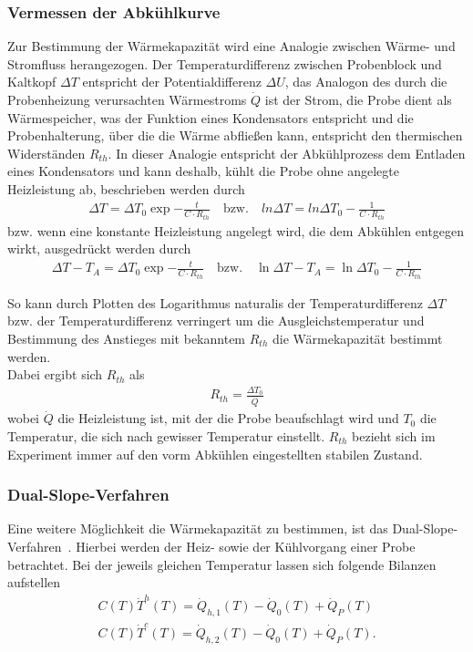 \documentclass[parskip=half, a4paper,twoside,final]{article}
\begin{document}
\subsubsection{Vermessen der Abkühlkurve}\label{sec:CV_Abkühlkurve}
Zur Bestimmung der Wärmekapazität wird eine Analogie zwischen Wärme- und Stromfluss herangezogen. Der Temperaturdifferenz zwischen Probenblock und Kaltkopf $\Delta T $ entspricht der Potentialdifferenz $\Delta U$, das Analogon des durch die Probenheizung verursachten Wärmestroms $\dot{Q}$ ist der Strom, die Probe dient als Wärmespeicher, was der Funktion eines Kondensators entspricht und die Probenhalterung, über die die Wärme abfließen kann, entspricht den thermischen Widerständen $R_{th}$. In dieser Analogie entspricht der Abkühlprozess dem Entladen eines Kondensators und kann deshalb, kühlt die Probe ohne angelegte Heizleistung ab, beschrieben werden durch
\begin{align}
  \Delta T = \Delta T_0 \exp{-\frac{t}{C\cdot R_{th}}} \quad \text{bzw.} \quad ln\Delta T = ln \Delta T_0 - \frac{1}{C\cdot R_{th}}
\end{align}
bzw. wenn eine konstante Heizleistung angelegt wird, die dem Abkühlen entgegen wirkt, ausgedrückt werden durch
\begin{align}
  \Delta T - T_A = \Delta T_0 \exp{-\frac{t}{C\cdot R_{th}}} \quad \text{bzw.} \quad \ln\Delta T -T_A= \ln \Delta T_0 - \frac{1}{C\cdot R_{th}}
\end{align}

So kann durch Plotten des Logarithmus naturalis der Temperaturdifferenz $\Delta T$ bzw. der Temperaturdifferenz verringert um die Ausgleichstemperatur und Bestimmung des Anstieges mit bekanntem $R_{th}$ die Wärmekapazität bestimmt werden. \\
Dabei ergibt sich $R_{th}$ als
\begin{align}
  R_{th} = \frac{\Delta T_0}{\dot{Q}}
\end{align}
wobei $\dot{Q}$ die Heizleistung ist, mit der die Probe beaufschlagt wird und $T_0$ die Temperatur, die sich nach gewisser Temperatur einstellt. $R_{th}$ bezieht sich im Experiment immer auf den vorm Abkühlen eingestellten stabilen Zustand.

\subsubsection{Dual-Slope-Verfahren}\label{sec:Dual-Slope}
Eine weitere Möglichkeit die Wärmekapazität zu bestimmen, ist das Dual-Slope-Verfahren~\cite{Riegel}. Hierbei werden der Heiz- sowie der Kühlvorgang einer Probe betrachtet. Bei der jeweils gleichen Temperatur lassen sich folgende Bilanzen aufstellen
\begin{align}
  C(T)\dot{T}^h (T) = \dot{Q}_{h,1} (T) - \dot{Q}_0(T)+\dot{Q}_P (T)\\
  C(T)\dot{T}^c (T) = \dot{Q}_{h,2} (T) - \dot{Q}_0(T)+\dot{Q}_P (T).
\end{align}
\end{document}
